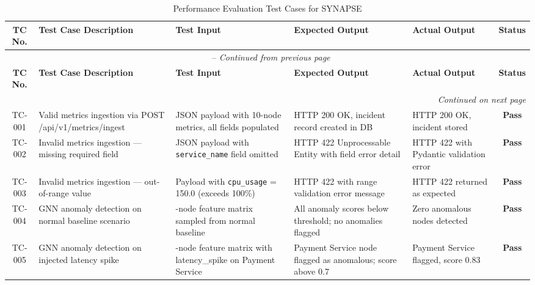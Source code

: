 \renewcommand{\arraystretch}{1.3}
\small
\begin{center}
\begin{longtable}{|c|>{\RaggedRight\arraybackslash}p{3.2cm}|>{\RaggedRight\arraybackslash}p{3.5cm}|>{\RaggedRight\arraybackslash}p{3.5cm}|>{\RaggedRight\arraybackslash}p{2.2cm}|c|}
\caption{Performance Evaluation Test Cases for SYNAPSE} \label{tab:testcases} \\
\hline
\textbf{TC No.} & \textbf{Test Case Description} & \textbf{Test Input} & \textbf{Expected Output} & \textbf{Actual Output} & \textbf{Status} \\
\hline
\endfirsthead
\multicolumn{6}{c}{\tablename\ \thetable{} -- \textit{Continued from previous page}} \\
\hline
\textbf{TC No.} & \textbf{Test Case Description} & \textbf{Test Input} & \textbf{Expected Output} & \textbf{Actual Output} & \textbf{Status} \\
\hline
\endhead
\hline \multicolumn{6}{r}{\textit{Continued on next page}} \\
\endfoot
\hline
\endlastfoot

TC-001 & Valid metrics ingestion via POST /api/v1/metrics/ingest & JSON payload with 10-node metrics, all fields populated & HTTP 200 OK, incident record created in DB & HTTP 200 OK, incident stored & \textbf{Pass} \\
\hline

TC-002 & Invalid metrics ingestion — missing required field & JSON payload with \texttt{service\_name} field omitted & HTTP 422 Unprocessable Entity with field error detail & HTTP 422 with Pydantic validation error & \textbf{Pass} \\
\hline

TC-003 & Invalid metrics ingestion — out-of-range value & Payload with \texttt{cpu\_usage} = 150.0 (exceeds 100\%) & HTTP 422 with range validation error message & HTTP 422 returned as expected & \textbf{Pass} \\
\hline

TC-004 & GNN anomaly detection on normal baseline scenario & 10-node feature matrix sampled from normal baseline & All anomaly scores below threshold; no anomalies flagged & Zero anomalous nodes detected & \textbf{Pass} \\
\hline

TC-005 & GNN anomaly detection on injected latency spike & 10-node feature matrix with latency\_spike on Payment Service & Payment Service node flagged as anomalous; score above 0.7 & Payment Service flagged, score 0.83 & \textbf{Pass} \\
\hline


\end{longtable}
\end{center}
